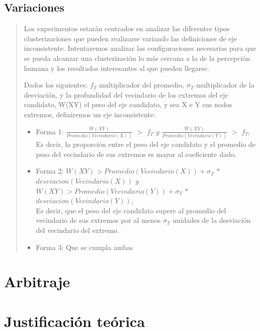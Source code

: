 \documentclass[8pt,a4paper]{article}
\begin{document}
\subsection{Variaciones}
\begin{verse}
Los experimentos estarán centrados en analizar las diferentes tipos clusterizaciones que pueden realizarse variando las definiciones de eje inconsistente. Intentaremos analizar las configuraciones necesarias para que se pueda alcanzar una clusterización lo más cercana a la de la percepción humana y los resultados interesantes al que pueden llegarse.

Dados los siguientes: $f_{T}$ multiplicador del promedio, $\sigma_{T}$ multiplicador de la desviación, y la profundidad del vecindario de los extremos del eje candidato, W(XY) el peso del eje candidato, y sea X e Y sus nodos extremos, definiremos un eje inconsistente:
\begin{itemize}
\item Forma 1: $\frac{W(XY)}{Promedio(Vecindario(X))}$ $>$ $f_{T}$ $  y $ $\frac{W(XY)}{Promedio(Vecindario(Y))}$ $>$ $f_{T}$, \\Es decir, la proporción entre el peso del eje candidato y el promedio de peso del vecindario de sus extremos es mayor al coeficiente dado.
\item Forma 2: $W(XY) >  Promedio(Vecindario(X)) + \sigma_{T}$ $ * $ $ desviacion(Vecindario(X)) $ $ y$ $W(XY) >  Promedio(Vecindario(Y)) + \sigma_{T}$ $ * $ $ desviacion(Vecindario(Y)) $, \\Es decir, que el peso del eje candidato supere al promedio del vecindario de sus extremos por al menos $\sigma_{T}$ unidades de la desviación del vecindario del extremo.

\item Forma 3: Que se cumpla ambas
\end{itemize}





\end{verse}

\pagebreak

\section{Arbitraje}
\section{Justificación teórica}
\end{document}
